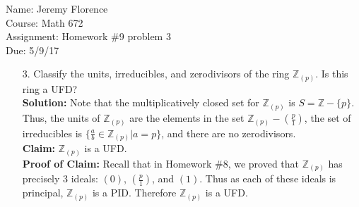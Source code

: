 \documentclass{article}
\newcounter{problem}
\newcommand\TheSolution{%
  \textbf{Solution:} %
}
\begin{document}
Name: Jeremy Florence\\
Course: Math 672\\
Assignment: Homework \#9 problem 3\\
Due: 5/9/17\\

\begin{enumerate}
\item[3.] Classify the units, irreducibles, and zerodivisors of the ring $\mathbb{Z}_{(p)}$. Is this ring a UFD?\\

\TheSolution Note that the multiplicatively closed set for $\mathbb{Z}_{(p)}$ is $S=\mathbb{Z}-\{p\}$.\\ Thus, the units of $\mathbb{Z}_{(p)}$ are the elements in the set $\mathbb{Z}_{(p)}-(\frac{p}{1})$, the set of irreducibles is $\{\frac{a}{b} \in \mathbb{Z}_{(p)} | a=p\}$, and there are no zerodivisors.\\

\textbf{Claim: } $\mathbb{Z}_{(p)}$ is a UFD.\\

\textbf{Proof of Claim: } Recall that in Homework \#8, we proved that $\mathbb{Z}_{(p)}$ has precisely 3 ideals: $(0)$, $(\frac{p}{1})$, and $(1)$. Thus as each of these ideals is principal, $\mathbb{Z}_{(p)}$ is a PID. Therefore $\mathbb{Z}_{(p)}$ is a UFD.
\end{enumerate}
\end{document}
